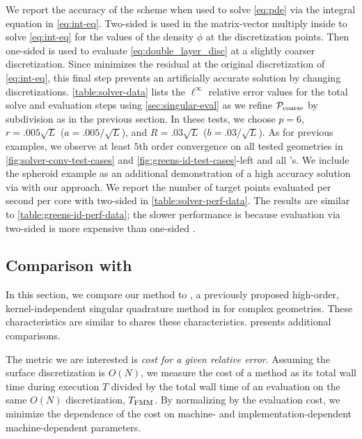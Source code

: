We report the accuracy of the \qbkix scheme when used to solve \cref{eq:pde} via the integral equation in \cref{eq:int-eq}.
Two-sided \qbkix is used in the matrix-vector multiply inside \gmres to solve \cref{eq:int-eq} for the values of the density $\phi$ at the discretization points.
Then one-sided \qbkix is used to evaluate \cref{eq:double_layer_disc} at a slightly coarser discretization. 
Since \gmres minimizes the residual at the original discretization of \cref{eq:int-eq}, this final step prevents an artificially accurate solution by changing discretizations.
\cref{table:solver-data} lists the $\ell^\infty$ relative error values for the total solve and evaluation steps using \cref{sec:singular-eval} as we refine ${\mathcal{P}_{\mathrm{coarse}}}$ by subdivision as in the previous section.
In these tests, we choose $p=6$, $r= .005\sqrt{L}$ ($a = .005/\sqrt{L}$), and  $R= .03\sqrt{L}$ ($b = .03/\sqrt{L}$).
As for previous examples, we observe at least $5$th order convergence on all tested geometries in \cref{fig:solver-conv-test-cases} and \cref{fig:greens-id-test-cases}-left and all \pde's.
We include the spheroid example as an additional demonstration of a high accuracy solution via \gmres with our approach.
We report the number of target points evaluated per second per core with two-sided \qbkix in \cref{table:solver-perf-data}.
The results are similar to \cref{table:greens-id-perf-data}; the slower performance is because evaluation via two-sided \qbkix is more expensive than one-sided \qbkix.
\subsection{Comparison with \cite{YBZ}\label{sec:results-compare}}
In this section,  we compare our method to \cite{YBZ}, a previously proposed high-order, kernel-independent singular quadrature method in \threed for complex geometries. These characteristics are similar to  \qbkix shares these characteristics. \cite[Section 4]{morse2020bsupplementary} presents additional comparisons.


The metric we are interested is \textit{cost for a given relative error}.
Assuming the surface discretization is $O(N)$, we measure the cost of a method as its total wall time during execution $T$ divided by the total wall time of an \fmm evaluation on the same $O(N)$ discretization, $T_{\mathrm{FMM}}$. 
By normalizing by the \fmm evaluation cost, we minimize the dependence of the cost on machine- and implementation-dependent machine-dependent parameters.

